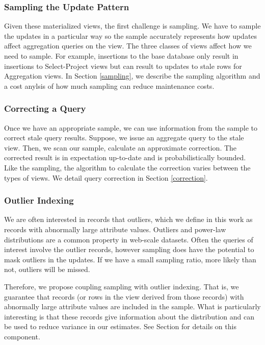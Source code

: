 \subsubsection{Sampling the Update Pattern}
Given these materialized views, the first challenge is sampling.
We have to sample the updates in a particular way so the sample accurately represents how updates
affect aggregation queries on the view. 
The three classes of views affect how we need to sample.
For example, insertions to the base database only result in insertions to Select-Project views but can result to updates to stale rows for Aggregation views.
In Section \ref{sampling}, we describe the sampling algorithm and a cost anylsis of how much sampling can reduce maintenance costs.

\subsubsection{Correcting a Query}
Once we have an appropriate sample, we can use information from the sample to correct stale query results.
Suppose, we issue an aggregate query to the stale view.
Then, we scan our sample, calculate an approximate correction.
The corrected result is in expectation up-to-date and is probabilistically bounded.
Like the sampling, the algorithm to calculate the correction varies between the types of views.
We detail query correction in Section \ref{correction}.

\subsubsection{Outlier Indexing}
We are often interested in records that outliers, 
which we define in this work as records with abnormally large attribute values.
Outliers and power-law distributions are a common property in web-scale datasets.
Often the queries of interest involve the outlier records, however sampling does 
have the potential to mask outliers in the updates.
If we have a small sampling ratio, more likely than not, outliers will be missed.

Therefore, we propose coupling sampling with outlier indexing. 
That is, we guarantee that records (or rows in the view derived from those records) 
with abnormally large attribute values are included in the sample.
What is particularly interesting is that these records give information about the distribution 
and can be used to reduce variance in our estimates.
See Section \label{outlier} for details on this component.


